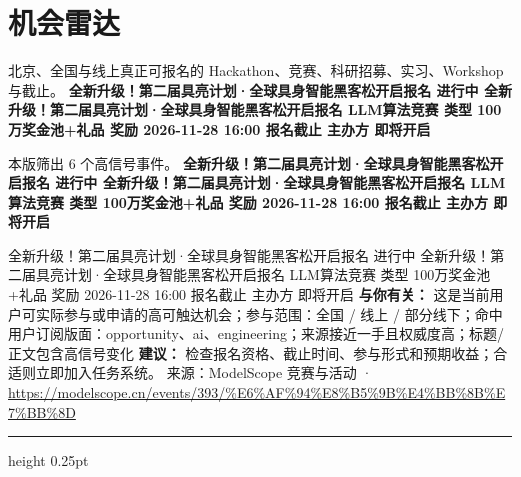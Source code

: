 \documentclass[10.5pt]{ctexart}
\begin{document}
\section*{机会雷达}
{\color{ormuted} 北京、全国与线上真正可报名的 Hackathon、竞赛、科研招募、实习、Workshop 与截止。}
\vspace{2mm}
{\LARGE\bfseries 全新升级！第二届具亮计划·全球具身智能黑客松开启报名 进行中 全新升级！第二届具亮计划·全球具身智能黑客松开启报名 LLM算法竞赛 类型 100万奖金池+礼品 奖励 2026-11-28 16:00 报名截止 主办方 即将开启}\par
\vspace{1mm}
{\color{ormuted} 本版筛出 6 个高信号事件。}
\vspace{3mm}
{\Large\bfseries 全新升级！第二届具亮计划·全球具身智能黑客松开启报名 进行中 全新升级！第二届具亮计划·全球具身智能黑客松开启报名 LLM算法竞赛 类型 100万奖金池+礼品 奖励 2026-11-28 16:00 报名截止 主办方 即将开启}\par
全新升级！第二届具亮计划·全球具身智能黑客松开启报名 进行中 全新升级！第二届具亮计划·全球具身智能黑客松开启报名 LLM算法竞赛 类型 100万奖金池+礼品 奖励 2026-11-28 16:00 报名截止 主办方 即将开启
\textbf{与你有关：} 这是当前用户可实际参与或申请的高可触达机会；参与范围：全国 / 线上 / 部分线下；命中用户订阅版面：opportunity、ai、engineering；来源接近一手且权威度高；标题/正文包含高信号变化
\textbf{建议：} 检查报名资格、截止时间、参与形式和预期收益；合适则立即加入任务系统。
{\footnotesize\color{ormuted} 来源：ModelScope 竞赛与活动 · \url{https://modelscope.cn/events/393/%E6%AF%94%E8%B5%9B%E4%BB%8B%E7%BB%8D}}
\vspace{4mm}
\hrule height 0.25pt
\vspace{3mm}
\end{document}
